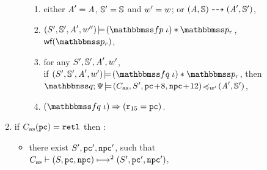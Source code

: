 \begin{definition}
\begin{enumerate}[1.]
\begin{itemize}
\begin{enumerate}[(1)]
                    \item either $\primcom' = \primcom$,
                    $\hpstate' = \hpstate$ and $\word' = \word$;
                    or
                    $\primTrans{(\primcom, \hpstate)}
                        {(\primcom', \hpstate')}$,

                    \item
                        $\asrtmodel{(\state', \hpstate', \primcom', \word'')}
                            {(\relspecpre \; \lgvl) * \relastP_r}$,
                        $\wfFrm(\relastP_r)$,

                    \item
                    for any $\state', \hpstate', \primcom', \word'$, \\
                    if $\asrtmodel{(\state', \hpstate', \primcom', \word')}
                        {(\relspecpost \; \lgvl) * \relastP_r}$,
                    then \\
                    $\simInsSeq{\relastQ}{\Cspec}{(\asmimp, \state', \pc\!+\!8, \npc\!+\!12)}
                        {\word'}{(\primcom', \hpstate')}$,

                    \item
                    $(\relspecpost \; \lgvl)
                    \Rightarrow (\reg{15} = \pc)$.
                \end{enumerate}
            \end{itemize}

        \item if $\asmimp(\pc) = \retl$ then :
            \begin{itemize}
                \item there exist $\state', \pc', \npc'$, such that
                \\
                $\multilptrans{\asmimp}{2}{(\state, \pc, \npc)}
                    {(\state', \pc', \npc')}$,


\end{itemize}
\end{enumerate}
\end{definition}
